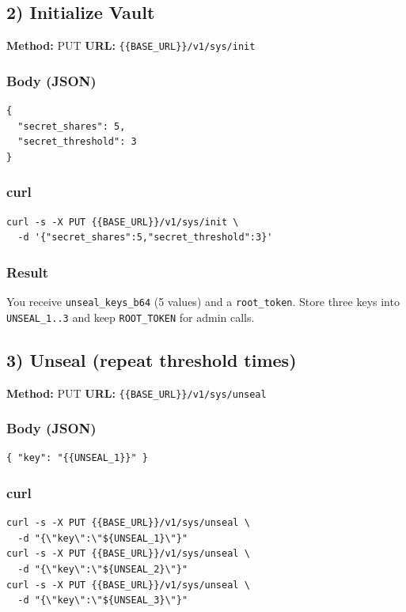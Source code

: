 \documentclass[11pt]{article}
\begin{document}
\subsection{2) Initialize Vault}
\textbf{Method:} PUT \quad \textbf{URL:} \texttt{\{\{BASE\_URL\}\}/v1/sys/init}

\subsubsection*{Body (JSON)}
\begin{verbatim}
{
  "secret_shares": 5,
  "secret_threshold": 3
}
\end{verbatim}

\subsubsection*{curl}
\begin{verbatim}
curl -s -X PUT {{BASE_URL}}/v1/sys/init \
  -d '{"secret_shares":5,"secret_threshold":3}'
\end{verbatim}

\subsubsection*{Result}
You receive \texttt{unseal\_keys\_b64} (5 values) and a \texttt{root\_token}. Store three keys into \texttt{UNSEAL\_1..3} and keep \texttt{ROOT\_TOKEN} for admin calls.

\subsection{3) Unseal (repeat threshold times)}
\textbf{Method:} PUT \quad \textbf{URL:} \texttt{\{\{BASE\_URL\}\}/v1/sys/unseal}

\subsubsection*{Body (JSON)}
\begin{verbatim}
{ "key": "{{UNSEAL_1}}" }
\end{verbatim}

\subsubsection*{curl}
\begin{verbatim}
curl -s -X PUT {{BASE_URL}}/v1/sys/unseal \
  -d "{\"key\":\"${UNSEAL_1}\"}"
curl -s -X PUT {{BASE_URL}}/v1/sys/unseal \
  -d "{\"key\":\"${UNSEAL_2}\"}"
curl -s -X PUT {{BASE_URL}}/v1/sys/unseal \
  -d "{\"key\":\"${UNSEAL_3}\"}"
\end{verbatim}
\end{document}
